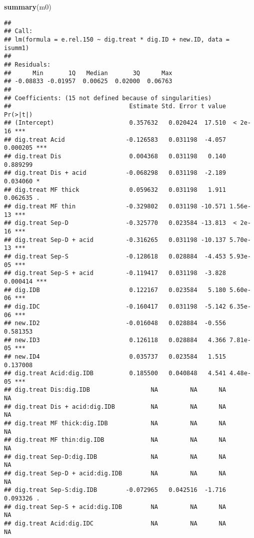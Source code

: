 \documentclass[
]{article}
\newenvironment{Shaded}{\begin{snugshade}}{\end{snugshade}}
\newcommand{\FunctionTok}[1]{\textcolor[rgb]{0.13,0.29,0.53}{\textbf{#1}}}
\newcommand{\NormalTok}[1]{#1}
\begin{document}
\begin{Shaded}
\begin{Highlighting}[]
\FunctionTok{summary}\NormalTok{(m0)}
\end{Highlighting}
\end{Shaded}

\begin{verbatim}
## 
## Call:
## lm(formula = e.rel.150 ~ dig.treat * dig.ID + new.ID, data = isumm1)
## 
## Residuals:
##      Min       1Q   Median       3Q      Max 
## -0.08833 -0.01957  0.00625  0.02000  0.06763 
## 
## Coefficients: (15 not defined because of singularities)
##                                 Estimate Std. Error t value Pr(>|t|)    
## (Intercept)                     0.357632   0.020424  17.510  < 2e-16 ***
## dig.treat Acid                 -0.126583   0.031198  -4.057 0.000205 ***
## dig.treat Dis                   0.004368   0.031198   0.140 0.889299    
## dig.treat Dis + acid           -0.068298   0.031198  -2.189 0.034060 *  
## dig.treat MF thick              0.059632   0.031198   1.911 0.062635 .  
## dig.treat MF thin              -0.329802   0.031198 -10.571 1.56e-13 ***
## dig.treat Sep-D                -0.325770   0.023584 -13.813  < 2e-16 ***
## dig.treat Sep-D + acid         -0.316265   0.031198 -10.137 5.70e-13 ***
## dig.treat Sep-S                -0.128618   0.028884  -4.453 5.93e-05 ***
## dig.treat Sep-S + acid         -0.119417   0.031198  -3.828 0.000414 ***
## dig.IDB                         0.122167   0.023584   5.180 5.60e-06 ***
## dig.IDC                        -0.160417   0.031198  -5.142 6.35e-06 ***
## new.ID2                        -0.016048   0.028884  -0.556 0.581353    
## new.ID3                         0.126118   0.028884   4.366 7.81e-05 ***
## new.ID4                         0.035737   0.023584   1.515 0.137008    
## dig.treat Acid:dig.IDB          0.185500   0.040848   4.541 4.48e-05 ***
## dig.treat Dis:dig.IDB                 NA         NA      NA       NA    
## dig.treat Dis + acid:dig.IDB          NA         NA      NA       NA    
## dig.treat MF thick:dig.IDB            NA         NA      NA       NA    
## dig.treat MF thin:dig.IDB             NA         NA      NA       NA    
## dig.treat Sep-D:dig.IDB               NA         NA      NA       NA    
## dig.treat Sep-D + acid:dig.IDB        NA         NA      NA       NA    
## dig.treat Sep-S:dig.IDB        -0.072965   0.042516  -1.716 0.093326 .  
## dig.treat Sep-S + acid:dig.IDB        NA         NA      NA       NA    
## dig.treat Acid:dig.IDC                NA         NA      NA       NA    

\end{verbatim}
\end{document}
